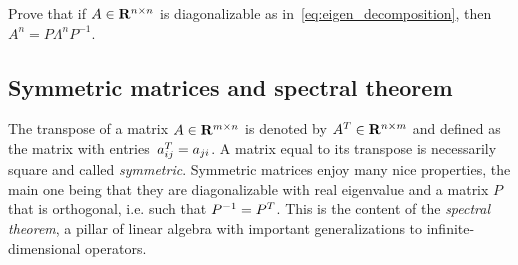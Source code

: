\begin{exercise}
    Prove that if $A \in \mathbf R^{n \times n}$ is diagonalizable as in~\eqref{eq:eigen_decomposition},
    then $A^n = P \Lambda^n P^{-1}$.
\end{exercise}

\subsection*{Symmetric matrices and spectral theorem}%
The transpose of a matrix $A \in \mathbf R^{m \times n}$ is denoted by $A^T \in \mathbf R^{n \times m}$
and defined as the matrix with entries~$a^T_{ij} = a_{ji}$.
A matrix equal to its transpose is necessarily square and called \emph{symmetric}.
Symmetric matrices enjoy many nice properties,
the main one being that they are diagonalizable with real eigenvalue and a matrix $P$ that is orthogonal,
i.e. such that $P^{-1} = P^T$.
This is the content of the \emph{spectral theorem},
a pillar of linear algebra with important generalizations to infinite-dimensional operators.

